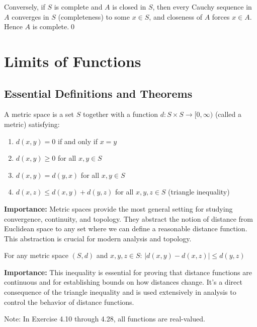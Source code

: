 Conversely, if $S$ is complete and $A$ is closed in $S$, then every Cauchy sequence in $A$ converges in $S$ (completeness) to some $x\in S$, and closeness of $A$ forces $x\in A$. Hence $A$ is complete.\qed
\medskip

\section{Limits of Functions}

\subsection*{Essential Definitions and Theorems}

\begin{definition}
A metric space is a set $S$ together with a function $d: S \times S \to [0,\infty)$ (called a metric) satisfying:
\begin{enumerate}
\item $d(x,y) = 0$ if and only if $x = y$
\item $d(x,y) \geq 0$ for all $x,y \in S$
\item $d(x,y) = d(y,x)$ for all $x,y \in S$
\item $d(x,z) \leq d(x,y) + d(y,z)$ for all $x,y,z \in S$ (triangle inequality)
\end{enumerate}
\end{definition}

\noindent\textbf{Importance:} Metric spaces provide the most general setting for studying convergence, continuity, and topology. They abstract the notion of distance from Euclidean space to any set where we can define a reasonable distance function. This abstraction is crucial for modern analysis and topology.



\begin{theorem}
For any metric space $(S,d)$ and $x,y,z \in S$: $|d(x,y) - d(x,z)| \leq d(y,z)$
\end{theorem}

\noindent\textbf{Importance:} This inequality is essential for proving that distance functions are continuous and for establishing bounds on how distances change. It's a direct consequence of the triangle inequality and is used extensively in analysis to control the behavior of distance functions.



Note: In Exercise 4.10 through 4.28, all functions are real-valued.




